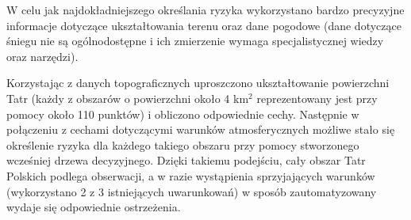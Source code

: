 W celu jak najdokładniejszego określania ryzyka wykorzystano bardzo precyzyjne informacje dotyczące ukształtowania terenu oraz dane pogodowe (dane dotyczące śniegu nie są ogólnodostępne i ich zmierzenie wymaga specjalistycznej wiedzy oraz narzędzi). 

Korzystając z danych topograficznych uproszczono ukształtowanie powierzchni Tatr (każdy z obszarów  o powierzchni około 4 km$^2$ reprezentowany jest przy pomocy około 110 punktów) i obliczono odpowiednie cechy. Następnie w połączeniu z cechami dotyczącymi warunków atmosferycznych możliwe stało się określenie ryzyka dla każdego takiego obszaru przy pomocy stworzonego wcześniej drzewa decyzyjnego. Dzięki takiemu podejściu, cały obszar Tatr Polskich podlega obserwacji, a w razie wystąpienia sprzyjających warunków (wykorzystano 2 z 3 istniejących uwarunkowań) w sposób zautomatyzowany wydaje się odpowiednie ostrzeżenia.



















